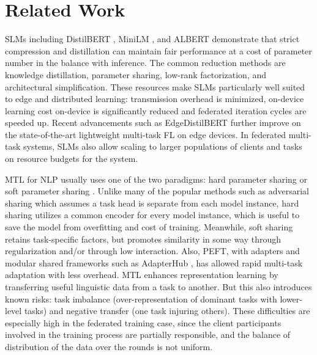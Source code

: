 \section{Related Work}
\label{sec:related_work}

SLMs including DistilBERT \cite{sanh2019distilbert}, MiniLM \cite{wang2020minilm}, and ALBERT \cite{lan2019albert} demonstrate that strict compression and distillation can maintain fair performance at a cost of parameter number in the balance with inference. The common reduction methods are knowledge distillation, parameter sharing, low-rank factorization, and architectural simplification. These resources make SLMs particularly well suited to edge and distributed learning: transmission overhead is minimized, on-device learning cost on-device is significantly reduced and federated iteration cycles are speeded up. Recent advancements such as EdgeDistilBERT \cite{wang2025edgedistilbert} further improve on the state-of-the-art lightweight multi-task FL on edge devices. In federated multi-task systems, SLMs also allow scaling to larger populations of clients and tasks on resource budgets for the system.


MTL for NLP usually uses one of the two paradigms: hard parameter sharing or soft parameter sharing \cite{smith2017federated,yu2020gradient}. Unlike many of the popular methods such as adversarial sharing which assumes a task head is separate from each model instance, hard sharing utilizes a common encoder for every model instance, which is useful to save the model from overfitting and cost of training. Meanwhile, soft sharing retains task-specific factors, but promotes similarity in some way through regularization and/or through low interaction. Also, PEFT, with adapters \cite{houlsby2019parameter} and modular shared frameworks such as AdapterHub \cite{pfeiffer2020adapterhub}, has allowed rapid multi-task adaptation with less overhead. MTL enhances representation learning by transferring useful linguistic data from a task to another. But this also introduces known risks: task imbalance (over-representation of dominant tasks with lower-level tasks) and negative transfer (one task injuring others). These difficulties are especially high in the federated training case, since the client participants involved in the training process are partially responsible, and the balance of distribution of the data over the rounds is not uniform.

